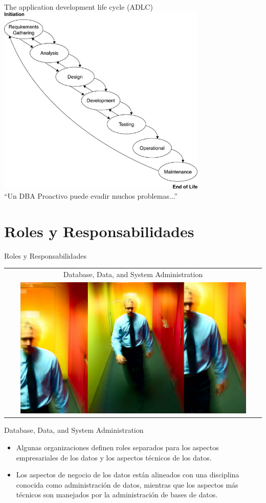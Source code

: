 \documentclass{beamer}
\begin{document}
\begin{frame}{The application development life cycle (ADLC)}
    \centering
    \includegraphics[width=0.75\textwidth]{figures/cycle.png} \\
    ``Un DBA Proactivo puede evadir muchos problemas...''
\end{frame}

\section{Roles y Responsabilidades}

\begin{frame}{Roles y Responsabilidades}
    \begin{tabular}{c}
        Database, Data, and System Administration \\
        \includegraphics[width=0.9\textwidth]{figures/DDS.png}
    \end{tabular}
\end{frame}

\begin{frame}{Database, Data, and System Administration}
    \begin{itemize}
        \item Algunas organizaciones definen roles separados para los aspectos empresariales de los datos y los aspectos técnicos de los datos.
        \item Los aspectos de negocio de los datos están alineados con una disciplina conocida como administración de datos, mientras que los aspectos más técnicos son manejados por la administración de bases de datos. 
    \end{itemize}
\end{frame}
\end{document}
